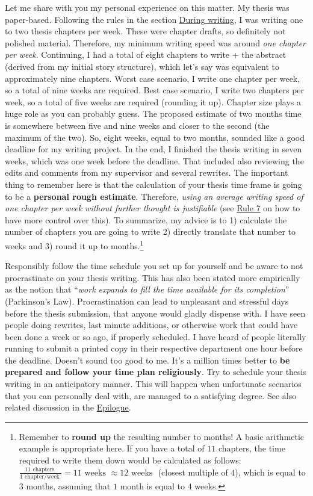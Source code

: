 \documentclass[
  12pt,
]{book}
\begin{document}
Let me share with you my personal experience on this matter.
My thesis was paper-based.
Following the rules in the section \protect\hyperlink{during}{During writing}, I was writing one to two thesis chapters per week.
These were chapter drafts, so definitely not polished material.
Therefore, my minimum writing speed was around \emph{one chapter per week}.
Continuing, I had a total of eight chapters to write + the abstract (derived from my initial story structure), which let's say was equivalent to approximately nine chapters.
Worst case scenario, I write one chapter per week, so a total of nine weeks are required.
Best case scenario, I write two chapters per week, so a total of five weeks are required (rounding it up).
Chapter size plays a huge role as you can probably guess.
The proposed estimate of two months time is somewhere between five and nine weeks and closer to the second (the maximum of the two).
So, eight weeks, equal to two months, sounded like a good deadline for my writing project.
In the end, I finished the thesis writing in seven weeks, which was one week before the deadline.
That included also reviewing the edits and comments from my supervisor and several rewrites.
The important thing to remember here is that the calculation of your thesis time frame is going to be a \textbf{personal rough estimate}.
Therefore, \emph{using an average writing speed of one chapter per week without further thought is justifiable} (see \protect\hyperlink{rule7}{Rule 7} on how to have more control over this).
To summarize, my advice is to 1) calculate the number of chapters you are going to write 2) directly translate that number to weeks and 3) round it up to months.\footnote{Remember to \textbf{round up} the resulting number to months! A basic arithmetic example is appropriate here. If you have a total of \(11\) chapters, the time required to write them down would be calculated as follows: \(\frac{11 \text{ chapters }}{1 \text{ chapter/week }}=11 \text{ weeks } \approx 12 \text{ weeks }\) (closest multiple of \(4\)), which is equal to \(3\) months, assuming that \(1\) month is equal to \(4\) weeks.}

Responsibly follow the time schedule you set up for yourself and be aware to not procrastinate on your thesis writing.
This has also been stated more empirically as the notion that ``\emph{work expands to fill the time available for its completion}'' (Parkinson's Law).
Procrastination can lead to unpleasant and stressful days before the thesis submission, that anyone would gladly dispense with.
I have seen people doing rewrites, last minute additions, or otherwise work that could have been done a week or so ago, if properly scheduled.
I have heard of people literally running to submit a printed copy in their respective department one hour before the deadline.
Doesn't sound too good to me.
It's a million times better to \textbf{be prepared and follow your time plan religiously}.
Try to schedule your thesis writing in an anticipatory manner.
This will happen when unfortunate scenarios that you can personally deal with, are managed to a satisfying degree.
See also related discussion in the \protect\hyperlink{epilogue}{Epilogue}.
\end{document}
